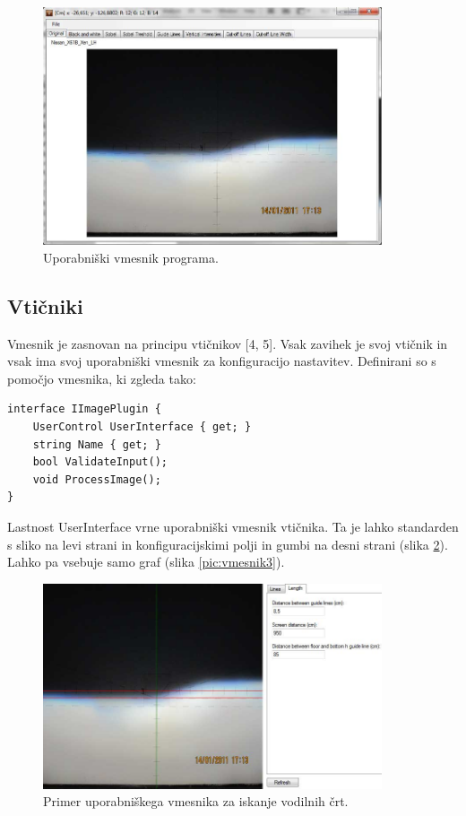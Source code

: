 \documentclass[oneside, a4paper, 12pt]{book}
\begin{document}
\begin{figure}
\begin{center}
\includegraphics[width=10cm]{slike/vmesnik-glavni.jpg}
\end{center}
\caption{Uporabniški vmesnik programa.}
\label{pic:vmesnik1}
\end{figure}

\subsection{Vtičniki}

Vmesnik je zasnovan na principu vtičnikov [4, 5]. Vsak zavihek je svoj vtičnik in vsak ima svoj uporabniški vmesnik za konfiguracijo nastavitev. Definirani so s pomočjo vmesnika, ki zgleda tako:

\begin{verbatim}
interface IImagePlugin {
    UserControl UserInterface { get; }
    string Name { get; }
    bool ValidateInput();
    void ProcessImage();
}
\end{verbatim}
Lastnost UserInterface vrne uporabniški vmesnik vtičnika. Ta je lahko standarden s sliko na levi strani in konfiguracijskimi polji in gumbi na desni strani (slika \ref{pic:vmesnik2}). Lahko pa vsebuje samo graf (slika \ref{pic:vmesnik3}).


\begin{figure}
\begin{center}
\includegraphics[width=10cm]{slike/vmesnik-slika-konfiguracija.jpg}
\end{center}
\caption{Primer uporabniškega vmesnika za iskanje vodilnih črt.}
\label{pic:vmesnik2}
\end{figure}
\end{document}

